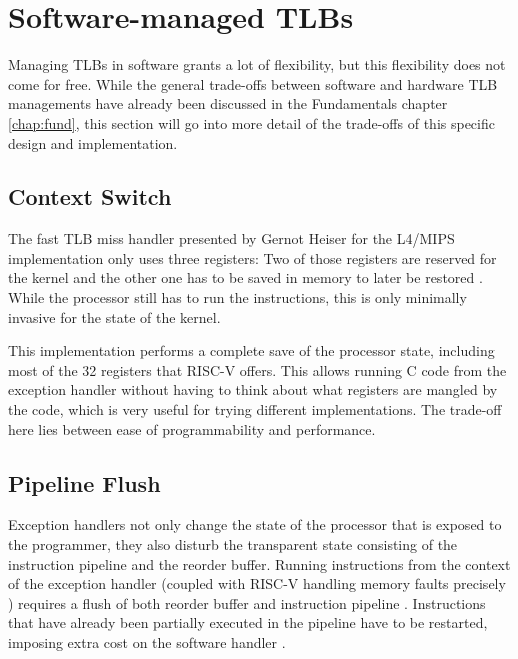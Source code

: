 \section{Software-managed TLBs}
Managing TLBs in software grants a lot of flexibility, but this flexibility does not come
for free. While the general trade-offs between software and hardware TLB managements have
already been discussed in the Fundamentals chapter \ref{chap:fund}, this section will
go into more detail of the trade-offs of this specific design and implementation.

\subsection{Context Switch} The fast TLB miss handler presented by Gernot Heiser for the
L4/MIPS implementation only uses three registers: Two of those registers are reserved
for the kernel and the other one has to be saved in memory to later be restored \cite{heiserAnatomyHighPerformanceMicrokernel}.
While the processor still has to run the instructions, this is only minimally invasive
for the state of the kernel.

This implementation performs a complete save of the processor state, including most of the
32 registers that RISC-V offers.
This allows running C code from the exception handler without having to think about what
registers are mangled by the code, which is very useful for trying different implementations.
The trade-off here lies between ease of programmability and performance.

\subsection{Pipeline Flush} Exception handlers not only change the state of the processor that is
exposed to the programmer, they also disturb the transparent state consisting of the
instruction pipeline and the reorder buffer.
Running instructions from the context of the exception handler (coupled with RISC-V handling
memory faults precisely \cite{RISCVInstructionSet}) requires a flush of both reorder buffer
and instruction pipeline \cite{jacobVirtualMemoryContemporary1998}.
Instructions that have already been partially executed in the pipeline have to be restarted,
imposing extra cost on the software handler \cite{jacob1998look}.


